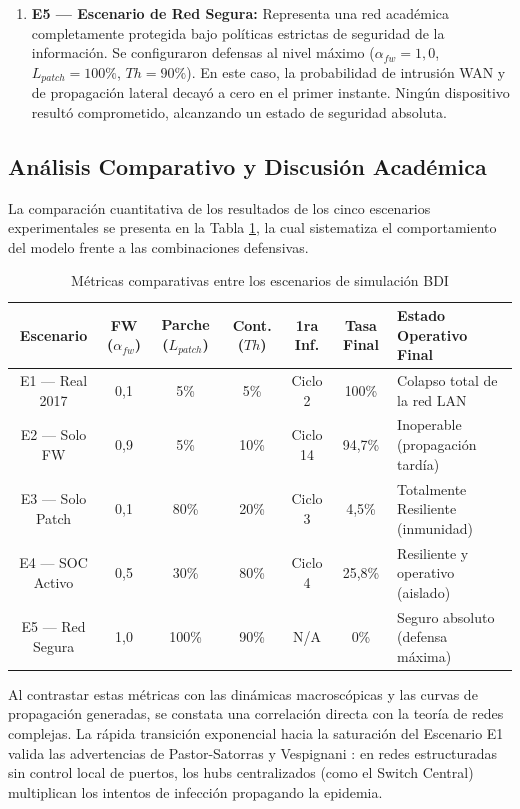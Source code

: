 \begin{enumerate}
    \item \textbf{E5 — Escenario de Red Segura:} Representa una red académica completamente protegida bajo políticas estrictas de seguridad de la información. Se configuraron defensas al nivel máximo ($\alpha_{fw} = 1,0$, $L_{patch} = 100\%$, $Th = 90\%$). En este caso, la probabilidad de intrusión WAN y de propagación lateral decayó a cero en el primer instante. Ningún dispositivo resultó comprometido, alcanzando un estado de seguridad absoluta.
\end{enumerate}

\subsection{Análisis Comparativo y Discusión Académica}
La comparación cuantitativa de los resultados de los cinco escenarios experimentales se presenta en la Tabla \ref{tab:comparativo_escenarios}, la cual sistematiza el comportamiento del modelo frente a las combinaciones defensivas.

\begin{table}[!t]
\caption{Métricas comparativas entre los escenarios de simulación BDI}
\label{tab:comparativo_escenarios}
\begin{center}
\begin{tabular}{|c|c|c|c|c|c|l|}
\hline
\textbf{Escenario} & \textbf{FW} ($\alpha_{fw}$) & \textbf{Parche} ($L_{patch}$) & \textbf{Cont.} ($Th$) & \textbf{1ra Inf.} & \textbf{Tasa Final} & \textbf{Estado Operativo Final} \\ \hline
E1 — Real 2017 & 0,1 & 5\% & 5\% & Ciclo 2 & 100\% & Colapso total de la red LAN \\ \hline
E2 — Solo FW & 0,9 & 5\% & 10\% & Ciclo 14 & 94,7\% & Inoperable (propagación tardía) \\ \hline
E3 — Solo Patch & 0,1 & 80\% & 20\% & Ciclo 3 & 4,5\% & Totalmente Resiliente (inmunidad) \\ \hline
E4 — SOC Activo & 0,5 & 30\% & 80\% & Ciclo 4 & 25,8\% & Resiliente y operativo (aislado) \\ \hline
E5 — Red Segura & 1,0 & 100\% & 90\% & N/A & 0\% & Seguro absoluto (defensa máxima) \\ \hline
\end{tabular}
\end{center}
\end{table}

Al contrastar estas métricas con las dinámicas macroscópicas y las curvas de propagación generadas, se constata una correlación directa con la teoría de redes complejas. La rápida transición exponencial hacia la saturación del Escenario E1 valida las advertencias de Pastor-Satorras y Vespignani \cite{pastorsatorras2001epidemic}: en redes estructuradas sin control local de puertos, los hubs centralizados (como el Switch Central) multiplican los intentos de infección propagando la epidemia. 


